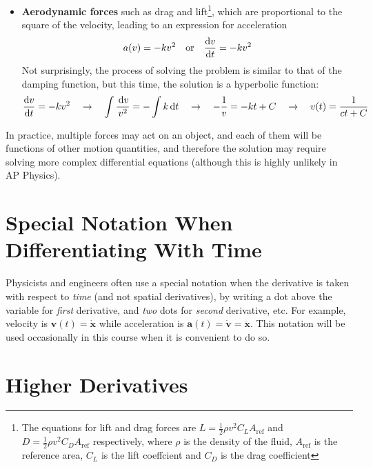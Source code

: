 \documentclass{../../../oss-handout}
\begin{document}
\begin{itemize}[leftmargin=15pt]
\item\textbf{Aerodynamic forces} such as drag and lift\footnote{The equations
  for lift and drag forces are $L=\frac12\rho v^2C_LA_\mathrm{ref}$ and
  $D=\frac12\rho v^2C_DA_\text{ref}$ respectively, where $\rho$ is the density
  of the fluid, $A_\text{ref}$ is the reference area, $C_L$ is the lift
  coeffcient and $C_D$ is the drag coefficient}, which are proportional
  to the square of the velocity, leading to an expression for acceleration 
  \begin{equation*}
    a(v)=-kv^2\quad\text{or}\quad \diff vt=-kv^2
  \end{equation*}
  Not surprisingly, the process of solving the problem is similar to that of
  the damping function, but this time, the solution is a hyperbolic function:
  \begin{equation*}
    \diff vt=-kv^2\quad\rightarrow\quad \int\frac{\dl v}{v^2}=-\int k\dl t
    \quad\rightarrow\quad -\frac1v=-kt+C
    \quad\rightarrow\quad v(t)=\frac{1}{ct+C}
  \end{equation*}
\end{itemize}
In practice, multiple forces may act on an object, and each of them will be
functions of other motion quantities, and therefore the solution may require
solving more complex differential equations (although this is highly unlikely in
AP Physics).

\section{Special Notation When Differentiating With Time}

Physicists and engineers often use a special notation when the derivative is
taken with respect to \emph{time} (and not spatial derivatives), by writing a
dot above the variable for \emph{first} derivative, and \emph{two} dots for
\emph{second} derivative, etc. For example, velocity is
$\bm{v}(t)=\dot{\bm{x}}$ while acceleration is
$\bm{a}(t)= \dot{\bm{v}}=\ddot{\bm{x}}$. This notation will be used occasionally
in this course when it is convenient to do so.


\section{Higher Derivatives}
\end{document}
